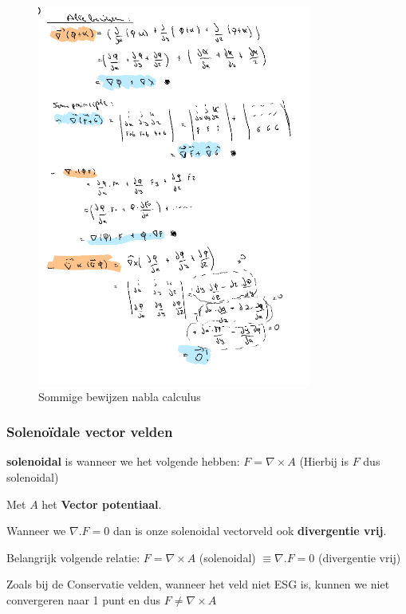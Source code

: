 \documentclass[a4paper]{report}
\begin{document}
\begin{figure}[H]
	\centering
	\includegraphics[width=0.8\textwidth]{assets/sommige_bewijzen_nabla_calculus.png}
	\caption{Sommige bewijzen nabla calculus}
	\label{fig:sommige_bewijzen_nabla_calculus}
\end{figure}

\subsubsection{Solenoïdale vector velden}

\textbf{solenoidal} is wanneer we het volgende hebben: $F = \nabla \times A$ (Hierbij is $F$ dus solenoidal)

Met $A$ het \textbf{Vector potentiaal}.

Wanneer we $\nabla . F = 0$ dan is onze solenoidal vectorveld ook \textbf{divergentie vrij}.

Belangrijk volgende relatie: $F = \nabla \times A$ (solenoidal) $\equiv \nabla . F = 0$ (divergentie vrij)

Zoals bij de Conservatie velden, wanneer het veld niet ESG is, kunnen we niet convergeren naar 1 punt en dus $F \neq \nabla \times A$
\end{document}
